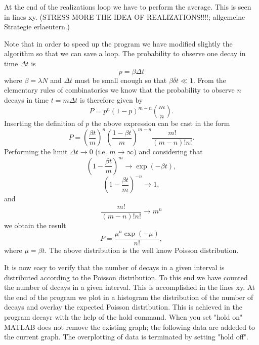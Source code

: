 At the end of the realizations loop
we have to perform the average. This is seen in lines xy.
(STRESS MORE THE IDEA OF REALIZATIONS!!!!; allgemeine Strategie erlaeutern.)

Note that in order to speed up the program we have modified slightly 
the algorithm  so that we can save a loop.
The probability to observe one decay in time $\Delta t$ is
\begin{equation}
p = \beta \Delta t
\end{equation}
where $\beta = \lambda N$ and $\Delta t$ must be small enough so 
that $\beta \delta t \ll 1$. 
From the elementary rules of combinatorics we know that
the probability to observe $n$ decays in time $t=m\Delta t$ is therefore
given by
\begin{equation}
P = p^n(1-p)^{m-n} {m \choose n}.
\end{equation}
Inserting the definition of $p$ the above expression can be cast 
in the form
\begin{equation}
P = \left( \frac{\beta t}{m}\right)^n 
     \left( \frac{1 - \beta t}{m} \right)^{m-n}
      \frac{m!}{(m-n)! n!}.
\end{equation}
Performing the limit $\Delta t \longrightarrow 0$ (i.e. $m 
\longrightarrow \infty$) and considering that
\begin{equation}
\left(1-  \frac{\beta t}{m} \right)^{m} \longrightarrow 
            \exp(-\beta t),
\end{equation}
\begin{equation}
\left( 1- \frac{ \beta t}{m} \right)^{-n} \longrightarrow 
            1,
\end{equation}
and
\begin{equation}
\frac{m!}{(m-n)! n!} \longrightarrow m^n
\end{equation}
we obtain the result
\begin{equation}
P = \frac{\mu^n \exp(-\mu)}{n!},
\end{equation}
where $\mu = \beta t$. The above distribution is the well know
Poisson distribution.

It is now easy to verify that the number of decays in a given 
interval is distributed according to the Poisson distribution.
To this end we have counted the number of decays in a given 
interval. This is accomplished in the lines xy. At the end of the
program we plot in a histogram the distribution of the number of 
decays and overlay the expected Poisson
distribution.  This is achieved in the program {\sf decayr} with the 
help of the {\sf hold} command. When you set "{\sf hold on}" MATLAB does not 
remove the existing graph; the following data are addeded to the 
current graph. The overplotting of data is terminated by 
setting "{\sf hold off}".

